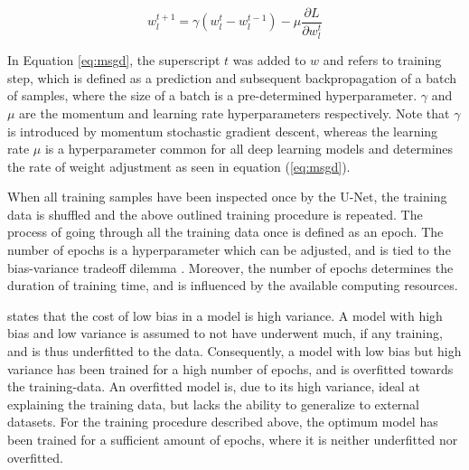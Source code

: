 \documentclass[../main/thesis.tex]{subfiles}
\begin{document}
\begin{equation}
    \label{eq:msgd}
    w_l^{t+1} = \gamma(w_l^t - w_l^{t-1}) - \mu\frac{\partial L}{\partial w_l^t}
\end{equation}

In Equation \ref{eq:msgd}, the superscript $t$ was added to $w$ and refers to training step, which is defined as a prediction and subsequent backpropagation of a batch of samples, where the size of a batch is a pre-determined hyperparameter. $\gamma$ and $\mu$ are the momentum and learning rate hyperparameters respectively. Note that $\gamma$ is introduced by momentum stochastic gradient descent, whereas the learning rate $\mu$ is a hyperparameter common for all deep learning models and determines the rate of weight adjustment as seen in equation (\ref{eq:msgd}).

When all training samples have been inspected once by the U-Net, the training data is shuffled and the above outlined training procedure is repeated. The process of going through all the training data once is defined as an epoch. The number of epochs is a hyperparameter which can be adjusted, and is tied to the bias-variance tradeoff dilemma \citep{Geman1992}. Moreover, the number of epochs determines the duration of training time, and is influenced by the available computing resources.

\citet{Geman1992} states that the cost of low bias in a model is high variance. A model with high bias and low variance is assumed to not have underwent much, if any training, and is thus underfitted to the data. Consequently, a model with low bias but high variance has been trained for a high number of epochs, and is overfitted towards the training-data. An overfitted model is, due to its high variance, ideal at explaining the training data, but lacks the ability to generalize to external datasets. For the training procedure described above, the optimum model has been trained for a sufficient amount of epochs, where it is neither underfitted nor overfitted.
\end{document}
